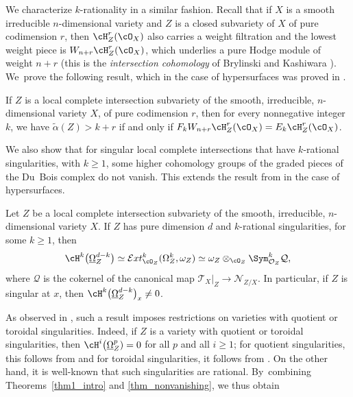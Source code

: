 We characterize $k$-rationality in a similar fashion. Recall that if $X$ is a smooth irreducible $n$-dimensional variety and $Z$ is a closed subvariety of $X$ of pure codimension $r$, then $\cH^r_Z(\cO_X)$ also carries a weight filtration and the lowest weight piece is $W_{n+r}\cH^r_Z(\cO_X)$, which underlies a pure
Hodge module of weight $n+r$ (this \DXmodule is the \emph{intersection cohomology} \DXmodule of Brylinski and Kashiwara \cite{BK}).
We~prove the following result,
which in the case of hypersurfaces was proved in \cite{Olano}.

\begin{thm}\label{thm2_intro}
If $Z$ is a local complete intersection subvariety of the smooth, irreducible, $n$-dimensional variety $X$, of pure codimension $r$, then for every nonnegative integer
$k$, we have $\widetilde{\alpha}(Z)>k+r$ if and only if
$F_kW_{n+r}\cH^r_Z(\cO_X)=E_k\cH^r_Z(\cO_X)$.
\end{thm}

We also show that for singular local complete intersections that have $k$-rational singularities, with $k\geq 1$, some higher cohomology groups of the graded
pieces of the Du~Bois complex do not vanish. This extends the result from \cite[Th.\,1.5]{MOPW} in the case of hypersurfaces.

\begin{thm}\label{thm_nonvanishing}
Let $Z$ be a local complete intersection subvariety of the smooth, irreducible, $n$-dimensional variety $X$. If $Z$ has pure dimension $d$ and $k$-rational singularities, for some $k\geq 1$,
then
\[
\cH^k\big(\underline\Omega^{d-k}_Z\big) \simeq \mathcal{E}{xt}^k_{\cO_Z}(\Omega_Z^k,\omega_Z) \simeq \omega_Z \otimes_{\cO_Z} \Sym^k_{\mathcal O_Z} \mathcal Q,
\]
where $\mathcal Q$ is the cokernel of the canonical map $\mathcal T_X|_Z \to \mathcal N_{Z/X}$. In particular, if $Z$ is singular at $x$, then
$\cH^k\big(\underline\Omega^{d-k}_Z\big)_x\neq 0$.
\end{thm}

As observed in \cite{MOPW}, such a result imposes restrictions on varieties with quotient or toroidal singularities.
Indeed, if $Z$ is a variety with quotient or toroidal singularities, then $\cH^i\big(\underline{\Omega}_Z^p)=0$ for all $p$ and all $i\geq 1$;
for quotient singularities, this follows from \cite[\S 5]{DuBois} and for toroidal singularities, it follows from \cite[Ch.\,V.4]{GNPP}.
On the other hand, it is well-known that such singularities are rational. By~combining Theorems~\ref{thm1_intro} and \ref{thm_nonvanishing},
we thus obtain

